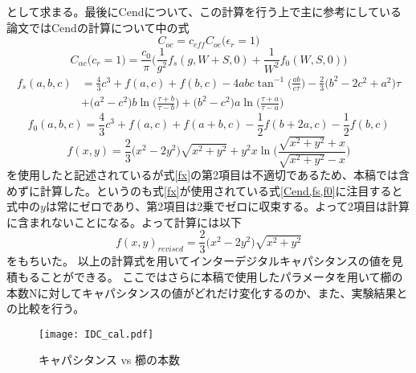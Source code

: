 として求まる。最後にCendについて、この計算を行う上で主に参考にしている論文\cite*{Dib2005}ではCendの計算について\cite*{Dib2001ComprehensiveSO}中の式
\begin{equation}
    C_{o c}=c_{e f f} C_{o e}\biggl(\epsilon_{r}=1\biggr)
\end{equation}
\begin{equation}
    \label{Cend}
    C_{\alpha c}\biggl(c_{r}=1\biggr)=\frac{c_{0}}{\pi}\biggl(\frac{1}{g^{2}} f_{s}(g, W+S, 0)+\frac{1}{W^{2}} f_{0}(W, S, 0)\biggr)
\end{equation}
\begin{equation}
    \label{fs}
    \begin{aligned}
    f_{s}(a, b, c) &=\frac{4}{3} c^{3}+f(a, c)+f(b, c)-4 a b c \tan ^{-1}\biggl(\frac{a b}{c \tau}\biggr)-\frac{2}{3}\biggl(b^{2}-2 c^{2}+a^{2}\biggr) \tau \\
    &+\biggl(a^{2}-c^{2}\biggr) b \ln \biggl(\frac{\tau+b}{\tau-b}\biggr)+\biggl(b^{2}-c^{2}\biggr) a \ln \biggl(\frac{\tau+a}{\tau-a}\biggr)
    \end{aligned}
\end{equation}
\begin{equation}
    \label{f0}
    f_{0}(a, b, c) =\frac{4}{3} c^{3}+f(a, c)+f(a+b, c)-\frac{1}{2} f(b+2 a, c)-\frac{1}{2} f(b, c)
\end{equation}
\begin{equation}
    \label{fx}
    f(x, y) =\frac{2}{3}\biggl(x^{2}-2 y^{2}\biggr) \sqrt{x^{2}+y^{2}}+y^{2} x \ln \biggl(\frac{\sqrt{x^{2}+y^{2}}+x}{\sqrt{x^{2}+y^{2}}-x}\biggr)
\end{equation}
を使用したと記述されているが式\ref*{fx}の第2項目は不適切であるため、本稿では含めずに計算した。というのも式\ref*{fx}が使用されている式\ref{Cend,fs,f0}に注目すると式\label{fx}中の$y$は常にゼロであり、第2項目は2乗でゼロに収束する。よって2項目は計算に含まれないことになる。よって計算には以下
\begin{equation}
    \label{fx_re}
    f(x, y)_{revised} =\frac{2}{3}\biggl(x^{2}-2 y^{2}\biggr) \sqrt{x^{2}+y^{2}}
\end{equation}
をもちいた。
以上の計算式を用いてインターデジタルキャパシタンスの値を見積もることができる。
ここではさらに本稿で使用したパラメータを用いて櫛の本数Nに対してキャパシタンスの値がどれだけ変化するのか、また、実験結果との比較を行う。
\begin{figure}[H]
    \centering
    \texttt{[image: IDC\_cal.pdf]}
    \caption{キャパシタンス vs 櫛の本数}
\end{figure}
